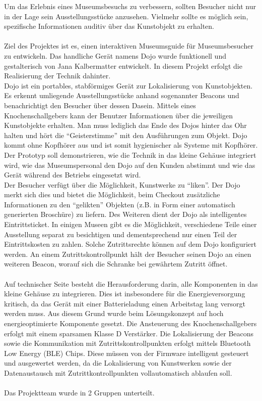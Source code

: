 Um das Erlebnis eines Museumsbesuchs zu verbessern, sollten Besucher nicht nur in der Lage sein Ausstellungsstücke anzusehen. Vielmehr sollte es möglich sein, spezifische Informationen auditiv über das Kunstobjekt zu erhalten.\\\\
Ziel des Projektes ist es, einen interaktiven Museumsguide für Museumsbesucher zu entwickeln. Das handliche Gerät namens Dojo wurde funktionell und gestalterisch von Jana Kalbermatter entwickelt. In diesem Projekt erfolgt die Realisierung der Technik dahinter. \\
Dojo ist ein portables, stabförmiges Gerät zur Lokalisierung von Kunstobjekten. Es erkennt umliegende Ausstellungsstücke anhand sogenannter Beacons und benachrichtigt den Besucher über dessen Dasein. Mittels eines Knochenschallgebers kann der Benutzer Informationen über die jeweiligen Kunstobjekte erhalten. Man muss lediglich das Ende des Dojos hinter das Ohr halten und hört die ``Geisterstimme'' mit den Ausführungen zum Objekt. Dojo kommt ohne Kopfhörer aus und ist somit hygienischer als Systeme mit Kopfhörer.
Der Prototyp soll demonstrieren, wie die Technik in das kleine Gehäuse integriert wird, wie das Museumspersonal den Dojo auf den Kunden abstimmt und wie das Gerät während des Betriebs eingesetzt wird.\\
Der Besucher verfügt über die Möglichkeit, Kunstwerke zu ``liken''. Der Dojo merkt sich dies und bietet die Möglichkeit, beim Checkout zusätzliche Informationen zu den ``gelikten'' Objekten (z.B. in Form einer automatisch generierten Broschüre) zu liefern.
Des Weiteren dient der Dojo als intelligentes Eintrittsticket. In einigen Museen gibt es die Möglichkeit, verschiedene Teile einer Ausstellung separat zu besichtigen und dementsprechend nur einen Teil der Eintrittskosten zu zahlen. Solche Zutrittsrechte können auf dem Dojo konfiguriert werden. An einem Zutrittskontrollpunkt hält der Besucher seinen Dojo an einen weiteren Beacon, worauf sich die Schranke bei gewährtem Zutritt öffnet.\\\\
Auf technischer Seite besteht die Herausforderung darin, alle Komponenten in das kleine Gehäuse zu integrieren. Dies ist insbesondere für die Energieversorgung kritisch, da das Gerät mit einer Batterieladung einen Arbeitstag lang versorgt werden muss. Aus diesem Grund wurde beim Lösungskonzept auf hoch energieoptimierte Komponente gesetzt. Die Ansteuerung des Knochenschallgebers erfolgt mit einem sparsamen Klasse D Verstärker. Die Lokalisierung der Beacons sowie die Kommunikation mit Zutrittskontrollpunkten erfolgt mittels Bluetooth Low Energy (BLE) Chips. Diese müssen von der Firmware intelligent gesteuert und ausgewertet werden, da die Lokalisierung von Kunstwerken sowie der Datenaustausch mit Zutrittkontrollpunkten vollautomatisch ablaufen soll.\\\\
Das Projektteam wurde in 2 Gruppen unterteilt. 